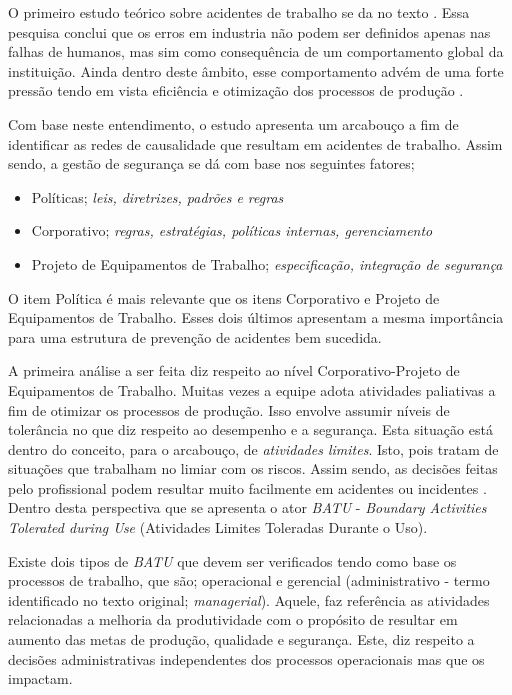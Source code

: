 O primeiro estudo teórico sobre acidentes de trabalho se da no texto \cite{riskoldschool}. Essa pesquisa conclui que os erros em industria não podem ser definidos apenas nas falhas de 
humanos, mas sim como consequência de um comportamento global da instituição. Ainda dentro deste âmbito, esse comportamento advém de uma forte pressão tendo em vista eficiência e otimização dos processos de produção \cite{riskoldschool} \cite{safety}.

Com base neste entendimento, o estudo \cite{safety} apresenta um arcabouço a fim de identificar as redes de causalidade que resultam em acidentes de trabalho. Assim sendo, a gestão de 
segurança se dá com base nos seguintes fatores; 
\begin{itemize}
    \item Políticas; \textit{leis, diretrizes, padrões e regras}
    \item Corporativo; \textit{regras, estratégias, políticas internas, gerenciamento}
    \item Projeto de Equipamentos de Trabalho; \textit{especificação, integração de segurança}
\end{itemize}

O item Política é mais relevante que os itens Corporativo e Projeto de Equipamentos de Trabalho. Esses dois últimos apresentam a mesma importância para uma estrutura de prevenção de acidentes 
bem sucedida. 

A primeira análise a ser feita diz respeito ao nível Corporativo-Projeto de Equipamentos de Trabalho. Muitas vezes a equipe adota atividades paliativas a fim de otimizar os processos de produção. Isso envolve assumir níveis de tolerância no que diz respeito ao desempenho e a segurança. Esta situação está dentro do conceito, para o arcabouço, de \textit{atividades limites}. Isto, pois tratam de situações que trabalham no limiar com os riscos. Assim sendo, as decisões feitas pelo profissional podem resultar muito facilmente em acidentes ou incidentes \cite{safety}. Dentro desta perspectiva que se apresenta o ator \textit{BATU} - \textit{Boundary Activities Tolerated during Use} (Atividades Limites Toleradas Durante o Uso).

Existe dois tipos de \textit{BATU} que devem ser verificados tendo como base os processos de trabalho, que são; operacional e gerencial (administrativo - termo identificado no texto original; \textit{managerial}). Aquele, faz referência as atividades relacionadas a melhoria da produtividade com o propósito de resultar em aumento das metas de produção, qualidade e segurança. Este, diz respeito a decisões administrativas independentes dos processos operacionais mas que os impactam.

